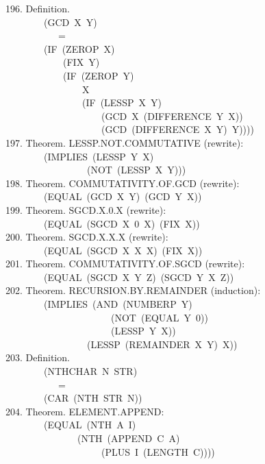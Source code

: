 \documentclass[10pt]{book}
\newenvironment{pubasis}{\begin{flushleft}}{\end{flushleft}}
\begin{document}
\begin{pubasis}
196.    Definition.\\
~~~~~~~~(GCD~X~Y)\\
~~~~~~~~~~~=\\
~~~~~~~~(IF~(ZEROP~X)\\
~~~~~~~~~~~~(FIX~Y)\\
~~~~~~~~~~~~(IF~(ZEROP~Y)\\
~~~~~~~~~~~~~~~~X\\
~~~~~~~~~~~~~~~~(IF~(LESSP~X~Y)\\
~~~~~~~~~~~~~~~~~~~~(GCD~X~(DIFFERENCE~Y~X))\\
~~~~~~~~~~~~~~~~~~~~(GCD~(DIFFERENCE~X~Y)~Y))))\\

197.    Theorem.  LESSP.NOT.COMMUTATIVE (rewrite):\\
~~~~~~~~(IMPLIES~(LESSP~Y~X)\\
~~~~~~~~~~~~~~~~~(NOT~(LESSP~X~Y)))\\

198.    Theorem.  COMMUTATIVITY.OF.GCD (rewrite):\\
~~~~~~~~(EQUAL~(GCD~X~Y)~(GCD~Y~X))\\

199.    Theorem.  SGCD.X.0.X (rewrite):\\
~~~~~~~~(EQUAL~(SGCD~X~0~X)~(FIX~X))\\

200.    Theorem.  SGCD.X.X.X (rewrite):\\
~~~~~~~~(EQUAL~(SGCD~X~X~X)~(FIX~X))\\

201.    Theorem.  COMMUTATIVITY.OF.SGCD (rewrite):\\
~~~~~~~~(EQUAL~(SGCD~X~Y~Z)~(SGCD~Y~X~Z))\\

202.    Theorem.  RECURSION.BY.REMAINDER (induction):\\
~~~~~~~~(IMPLIES~(AND~(NUMBERP~Y)\\
~~~~~~~~~~~~~~~~~~~~~~(NOT~(EQUAL~Y~0))\\
~~~~~~~~~~~~~~~~~~~~~~(LESSP~Y~X))\\
~~~~~~~~~~~~~~~~~(LESSP~(REMAINDER~X~Y)~X))\\

203.    Definition.\\
~~~~~~~~(NTHCHAR~N~STR)\\
~~~~~~~~~~~=\\
~~~~~~~~(CAR~(NTH~STR~N))\\

204.    Theorem.  ELEMENT.APPEND:\\
~~~~~~~~(EQUAL~(NTH~A~I)\\
~~~~~~~~~~~~~~~(NTH~(APPEND~C~A)\\
~~~~~~~~~~~~~~~~~~~~(PLUS~I~(LENGTH~C))))\\


\end{pubasis}
\end{document}

